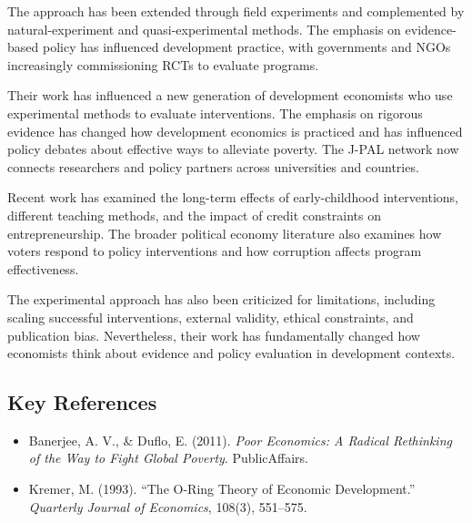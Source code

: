 The approach has been extended through field experiments and complemented by
natural-experiment and quasi-experimental methods. The emphasis on evidence-based
policy has influenced development practice, with governments and NGOs increasingly
commissioning RCTs to evaluate programs.

Their work has influenced a new generation of development economists who use
experimental methods to evaluate interventions. The emphasis on rigorous evidence
has changed how development economics is practiced and has influenced policy
debates about effective ways to alleviate poverty. The J-PAL network now connects
researchers and policy partners across universities and countries.

Recent work has examined the long-term effects of early-childhood interventions,
different teaching methods, and the impact of credit constraints on entrepreneurship.
The broader political economy literature also examines how voters respond to
policy interventions and how corruption affects program effectiveness.

The experimental approach has also been criticized for limitations, including
scaling successful interventions, external validity, ethical constraints, and
publication bias. Nevertheless, their work has fundamentally changed how
economists think about evidence and policy evaluation in development contexts.

\subsection*{Key References}
\begin{itemize}
    \item Banerjee, A. V., \& Duflo, E. (2011). \textit{Poor Economics: A Radical Rethinking of the Way to Fight Global Poverty}. PublicAffairs.
    \item Kremer, M. (1993). ``The O-Ring Theory of Economic Development.'' \textit{Quarterly Journal of Economics}, 108(3), 551--575.
\end{itemize}
